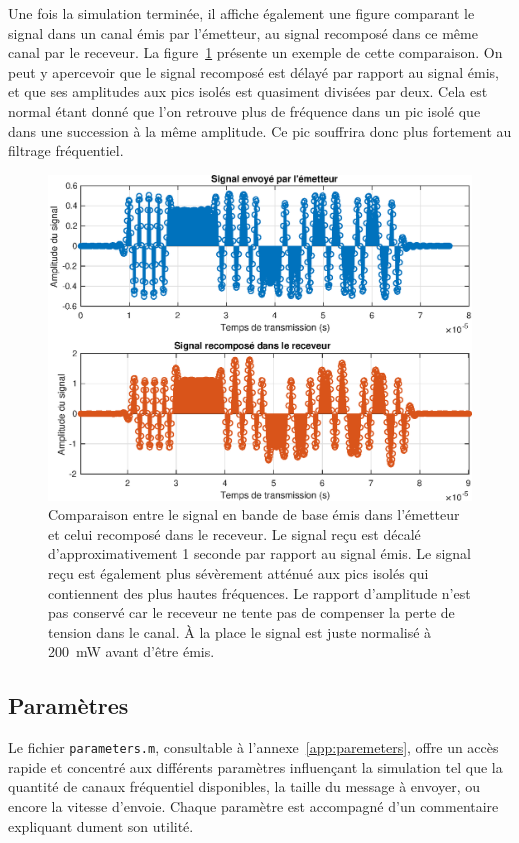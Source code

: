 \documentclass[10pt, oneside, a4paper]{article}
\begin{document}
Une fois la simulation terminée, il affiche également une figure comparant le signal dans un canal émis par l'émetteur, au signal recomposé dans ce même canal par le receveur.
La figure~\ref{fig:comparaison} présente un exemple de cette comparaison.
On peut y apercevoir que le signal recomposé est délayé par rapport au signal émis, et que ses amplitudes aux pics isolés est quasiment divisées par deux.
Cela est normal étant donné que l'on retrouve plus de fréquence dans un pic isolé que dans une succession à la même amplitude.
Ce pic souffrira donc plus fortement au filtrage fréquentiel.

\begin{figure}[p]
    \centering
    \includegraphics[height=0.45\textheight]{eps/comparaison.eps}
    \caption{Comparaison entre le signal en bande de base émis dans l'émetteur et celui
             recomposé dans le receveur.
             Le signal reçu est décalé d'approximativement 1 seconde par rapport au signal
             émis.
             Le signal reçu est également plus sévèrement atténué aux pics isolés qui
             contiennent des plus hautes fréquences.
             Le rapport d'amplitude n'est pas conservé car le receveur ne tente pas de
             compenser la perte de tension dans le canal.
             À la place le signal est juste normalisé à \SI{200}{\milli\watt} avant
             d'être émis.}
    \label{fig:comparaison}
\end{figure}

\subsection{Paramètres}
Le fichier \texttt{parameters.m}, consultable à l'annexe~\ref{app:paremeters}, offre un accès rapide et concentré aux différents paramètres influençant la simulation tel que la quantité de canaux fréquentiel disponibles, la taille du message à envoyer, ou encore la vitesse d'envoie.
Chaque paramètre est accompagné d'un commentaire expliquant dument son utilité.
\end{document}
